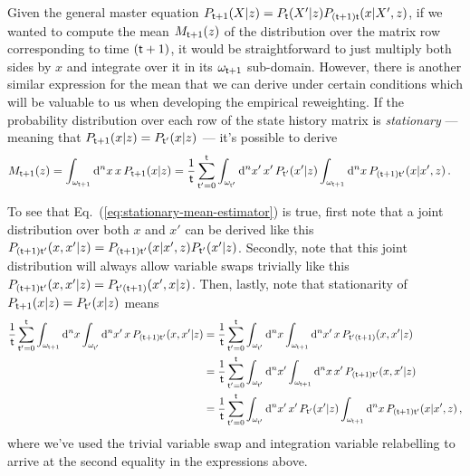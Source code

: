 Given the general master equation $P_{{\sf t}+1}(X\vert z) = P_{{\sf t}}(X'\vert z) P_{({\sf t}+1){\sf t}}(x\vert X',z)$, if we wanted to compute the mean $M_{{\sf t}+1}(z)$ of the distribution over the matrix row corresponding to time $({\sf t}+1)$, it would be straightforward to just multiply both sides by $x$ and integrate over it in its $\omega_{{\sf t}+1}$ sub-domain. However, there is another similar expression for the mean that we can derive under certain conditions which will be valuable to us when developing the empirical reweighting. If the probability distribution over each row of the state history matrix is \emph{stationary} --- meaning that $P_{{\sf t}+1}(x\vert z)=P_{{\sf t}'}(x\vert z)$ --- it's possible to derive
\begin{align}
M_{{\sf t}+1}(z) &= \int_{\omega_{{\sf t}+1}}{\rm d}^nx \,x\,P_{{\sf t}+1}(x\vert z) = \frac{1}{{\sf t}}\sum_{{\sf t}'=0}^{{\sf t}}\int_{\omega_{{\sf t}'}}{\rm d}^nx' \,x'\, P_{{\sf t}'}(x'\vert z) \int_{\omega_{{\sf t}+1}}{\rm d}^nx\, P_{({\sf t}+1){\sf t}'}(x\vert x',z) \label{eq:stationary-mean-estimator}\,.
\end{align}

To see that Eq.~(\ref{eq:stationary-mean-estimator}) is true, first note that a joint distribution over both $x$ and $x'$ can be derived like this $P_{({\sf t}+1){\sf t}'}(x,x'\vert z)=P_{({\sf t}+1){\sf t}'}(x\vert x',z)P_{{\sf t}'}(x'\vert z)$. Secondly, note that this joint distribution will always allow variable swaps trivially like this $P_{({\sf t}+1){\sf t}'}(x,x'\vert z)=P_{{\sf t}'({\sf t}+1)}(x',x\vert z)$. Then, lastly, note that stationarity of $P_{{\sf t}+1}(x\vert z)=P_{{\sf t}'}(x\vert z)$ means 
\begin{align}
\frac{1}{{\sf t}}\sum_{{\sf t}'=0}^{{\sf t}}\int_{\omega_{{\sf t}+1}} {\rm d}^nx\int_{\omega_{{\sf t}'}} {\rm d}^nx' \,x\, P_{({\sf t}+1){\sf t}'}(x,x'\vert z)&=\frac{1}{{\sf t}}\sum_{{\sf t}'=0}^{{\sf t}}\int_{\omega_{{\sf t}'}} {\rm d}^nx\int_{\omega_{{\sf t}+1}} {\rm d}^nx' \,x\, P_{{\sf t}'({\sf t}+1)}(x,x'\vert z)\nonumber \\
&=\frac{1}{{\sf t}}\sum_{{\sf t}'=0}^{{\sf t}}\int_{\omega_{{\sf t}'}} {\rm d}^nx'\int_{\omega_{{\sf t}+1}} {\rm d}^nx \,x'\, P_{({\sf t}+1){\sf t}'}(x,x'\vert z) \nonumber \\
&=\frac{1}{{\sf t}}\sum_{{\sf t}'=0}^{{\sf t}}\int_{\omega_{{\sf t}'}}{\rm d}^nx' \,x'\, P_{{\sf t}'}(x'\vert z) \int_{\omega_{{\sf t}+1}}{\rm d}^nx\, P_{({\sf t}+1){\sf t}'}(x\vert x',z)\nonumber \,,
\end{align}
where we've used the trivial variable swap and integration variable relabelling to arrive at the second equality in the expressions above. 

